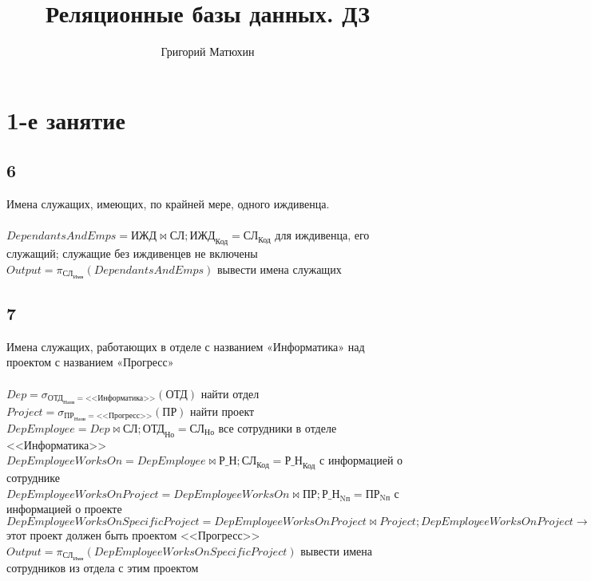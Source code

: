 \documentclass[12pt]{article}
\author{Григорий Матюхин}
\date{\formatdate{8}{10}{2023}}
\title{Реляционные базы данных. ДЗ}
\newcommand{\employee}{\textbf{СЛ}}
\newcommand{\department}{\textbf{ОТД}}
\newcommand{\project}{\textbf{ПР}}
\newcommand{\dependant}{\textbf{ИЖД}}
\newcommand{\workson}{\textbf{Р\_Н}}
\newcommand{\employeeName}{\textbf{СЛ}_\text{Имя}}
\newcommand{\employeeId}{\textbf{СЛ}_\text{Код}}
\newcommand{\employeeDepId}{\textbf{СЛ}_\text{Но}}
\newcommand{\departmentName}{\textbf{ОТД}_\text{Назв}}
\newcommand{\departmentId}{\textbf{ОТД}_\text{Но}}
\newcommand{\projectName}{\textbf{ПР}_\text{Назв}}
\newcommand{\projectId}{\textbf{ПР}_\text{Nп}}
\newcommand{\dependantEmpId}{\textbf{ИЖД}_\text{Код}}
\newcommand{\worksonEmpId}{\textbf{Р\_Н}_\text{Код}}
\newcommand{\worksonProjId}{\textbf{Р\_Н}_\text{Nп}}
\newcommand{\filter}[2]{\sigma{}_{#1} \allowbreak \left( #2 \right)}
\newcommand{\join}[3]{ #1 \bowtie #2;\allowbreak #3 }
\newcommand{\select}[2]{\pi_{#1} \allowbreak \left( #2 \right)}
\begin{document}
\maketitle
\newpage

\section{1-е занятие}
\subsection{6}

Имена служащих, имеющих, по крайней мере, одного иждивенца. \\\\
$ DependantsAndEmps = \join{\dependant}{\employee}{\dependantEmpId = \employeeId} $ 
  для иждивенца, его служащий; служащие без иждивенцев не включены  \\ 
$ Output = \select{\employeeName}{DependantsAndEmps} $ 
 вывести имена служащих \\ 

\subsection{7}
Имена служащих, работающих в отделе с названием «Информатика» над проектом с названием «Прогресс»\\\\
$ Dep = \filter{\departmentName = \text{<<Информатика>>}}{\department}$ 
 найти отдел \\ 
$ Project = \filter{\projectName = \text{<<Прогресс>>}}{\project}$ 
   найти проект \\ 
$ DepEmployee = \join{Dep}{\employee}{\departmentId = \employeeDepId}$ 
  все сотрудники в отделе <<Информатика>>  \\ 
$ DepEmployeeWorksOn = \join{DepEmployee}{\workson}{\employeeId = \worksonEmpId}$ 
 с информацией о сотруднике   \\ 
$ DepEmployeeWorksOnProject = \join{DepEmployeeWorksOn}{\project}{\worksonProjId = \projectId}$ 
  с информацией о проекте  \\ 
$ DepEmployeeWorksOnSpecificProject = \join{DepEmployeeWorksOnProject}{Project}{DepEmployeeWorksOnProject\rightarrow \projectId = Project\rightarrow\projectId}$ 
 этот проект должен быть проектом <<Прогресс>> \\ 
$ Output = \select{\employeeName}{DepEmployeeWorksOnSpecificProject}$ 
 вывести имена сотрудников из отдела с этим проектом   \\ 
\end{document}
